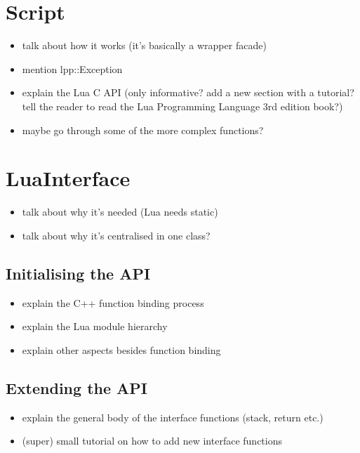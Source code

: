 \section{Script}

\begin{itemize}
    \item talk about how it works (it's basically a wrapper facade)
    \item mention lpp::Exception
    \item explain the Lua C API (only informative? add a new section with a tutorial?
        tell the reader to read the Lua Programming Language 3rd edition book?)
    \item maybe go through some of the more complex functions?
\end{itemize}

\section{LuaInterface}

\begin{itemize}
    \item talk about why it's needed (Lua needs static)
    \item talk about why it's centralised in one class?
\end{itemize}

\subsection{Initialising the API}

\begin{itemize}
    \item explain the C++ function binding process
    \item explain the Lua module hierarchy
    \item explain other aspects besides function binding
\end{itemize}

\subsection{Extending the API}

\begin{itemize}
    \item explain the general body of the interface functions (stack, return etc.)
    \item (super) small tutorial on how to add new interface functions
\end{itemize}

